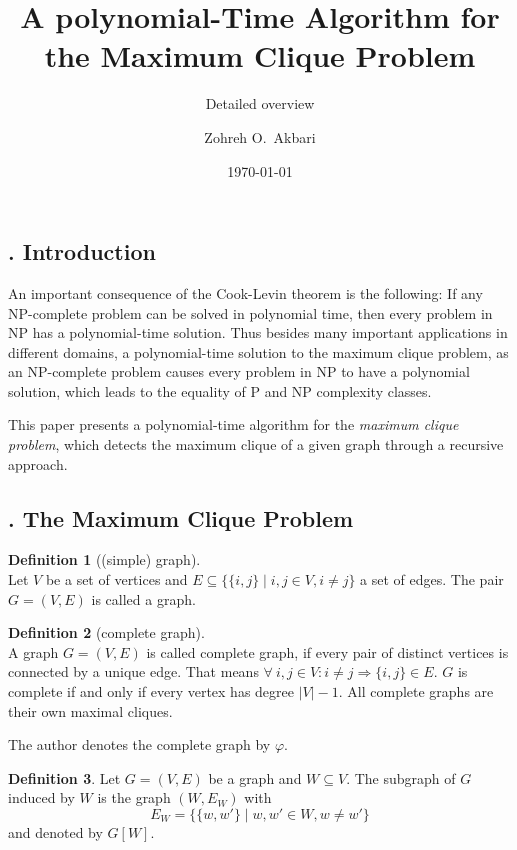 \documentclass[12pt, xcolor=dvipsnames]{scrartcl}
\title{A polynomial-Time Algorithm for the Maximum Clique Problem}
\subtitle{Detailed overview}
\author{Zohreh O.~Akbari}
\date{\today}
\theoremstyle{definition}
\newtheorem{definition}{Definition}%
\theoremstyle{definition}
\begin{document}
\maketitle

\newpage

\subsection*{. Introduction}
An important consequence of the Cook-Levin theorem is the following: If any NP-complete problem can be solved in polynomial time, then every problem in NP has a polynomial-time solution. Thus besides many important applications in different domains, a polynomial-time solution to the maximum clique problem, as an NP-complete problem causes every problem in NP to have a polynomial solution, which leads to the equality of P and NP complexity classes.

This paper presents a polynomial-time algorithm for the \textit{maximum clique problem}, which detects the maximum clique of a given graph through a recursive approach.

\subsection*{. The Maximum Clique Problem}

\begin{definition}[(simple) graph]\ \\
    Let $V$ be a set of vertices and $E \subseteq \{ \{i,j\} \mid i,j \in V, i \neq j\}$ a set of edges. The pair $G = (V,E)$ is called a graph.
\end{definition}

\begin{definition}[complete graph]\ \\
    A graph $G = (V,E)$ is called complete graph, if every pair of distinct vertices is connected by a unique edge. That means $\forall ~ i,j \in V\colon i \neq j \Longrightarrow \{i,j\} \in E$. $G$ is complete if and only if every vertex has degree $|V|-1$. All complete graphs are their own maximal cliques.
\end{definition}    

The author denotes the complete graph by $\varphi$.

\begin{definition}
	Let $G = (V,E)$ be a graph and $W\subseteq V$. The subgraph of $G$ induced by $W$ is
	the graph $(W,E_W)$ with
	\begin{equation*}
		E_W = \{\{w, w'\}\mid w, w'\in W, w\neq w'\}
	\end{equation*}
	and denoted by $G[W]$.
\end{definition}
\end{document}
